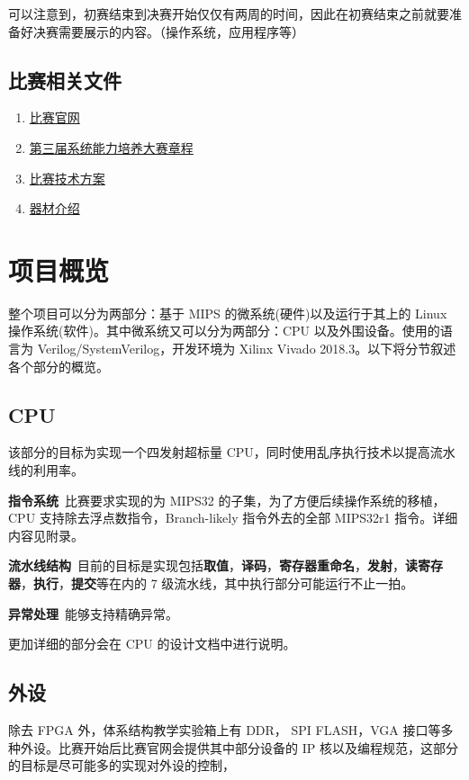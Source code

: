 \documentclass[blue,normal,cn]{elegantnote}
\begin{document}
可以注意到，初赛结束到决赛开始仅仅有两周的时间，因此在初赛结束之前就要准备好决赛需要展示的内容。（操作系统，应用程序等）
\subsection{比赛相关文件}
\begin{enumerate}[1.]
	\item \href{http://www.nscscc.org}{比赛官网}
	\item \href{http://www.nscscc.org/uploads/soft/190318/\%E7\%AC\%AC\%E4\%B8\%89\%E5\%B1\%8A\%E7\%B3\%BB\%E7\%BB\%9F\%E8\%83\%BD\%E5\%8A\%9B\%E5\%9F\%B9\%E5\%85\%BB\%E5\%A4\%A7\%E8\%B5\%9B\%E7\%AB\%A0\%E7\%A8\%8B-\%E7\%9B\%96\%E7\%AB\%A0\%E7\%89\%88.pdf} {第三届系统能力培养大赛章程}
	\item \href{http://www.nscscc.org/uploads/soft/190306/\%E6\%8A\%80\%E6\%9C\%AF\%E6\%96\%B9\%E6\%A1\%882019_V1.pdf}{比赛技术方案}
	\item \href{http://www.nscscc.org/uploads/soft/170318/1-1F31P20H9.docx}{器材介绍}
\end{enumerate}
\section{项目概览}
整个项目可以分为两部分：基于 MIPS 的微系统(硬件)以及运行于其上的 Linux 操作系统(软件)。其中微系统又可以分为两部分：CPU 以及外围设备。使用的语言为 Verilog/SystemVerilog，开发环境为 Xilinx Vivado 2018.3。以下将分节叙述各个部分的概览。
\subsection{CPU}
该部分的目标为实现一个四发射超标量 CPU，同时使用乱序执行技术以提高流水线的利用率。

\textbf{指令系统}\ 比赛要求实现的为 MIPS32 的子集，为了方便后续操作系统的移植，CPU 支持除去浮点数指令，Branch-likely 指令外去的全部 MIPS32r1 指令。详细内容见附录。

\textbf{流水线结构}\ 目前的目标是实现包括\textbf{取值}，\textbf{译码}，\textbf{寄存器重命名}，\textbf{发射}，\textbf{读寄存器}，\textbf{执行}，\textbf{提交}等在内的 7 级流水线，其中执行部分可能运行不止一拍。

\textbf{异常处理}\ 能够支持精确异常。

更加详细的部分会在 CPU 的设计文档中进行说明。

\subsection{外设}
除去 FPGA 外，体系结构教学实验箱上有 DDR， SPI FLASH，VGA 接口等多种外设。比赛开始后比赛官网会提供其中部分设备的 IP 核以及编程规范，这部分的目标是尽可能多的实现对外设的控制，
\end{document}
